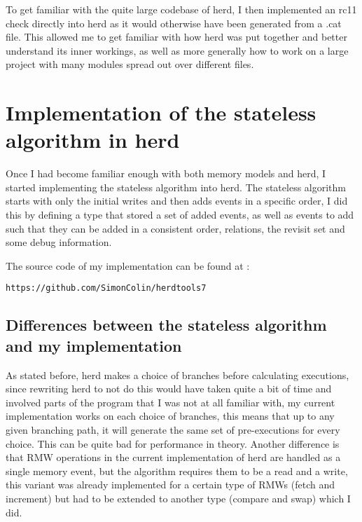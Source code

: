 \documentclass[a4,12pt]{article}
\begin{document}
To get familiar with the quite large codebase of herd, I then implemented an rc11 check directly into herd as it would otherwise have been generated from a .cat file. This allowed me to get familiar with how herd was put together and better understand its inner workings, as well as more generally how to work on a large project with many modules spread out over different files.

\section{Implementation of the stateless algorithm in herd}

Once I had become familiar enough with both memory models and herd, I started implementing the stateless algorithm into herd. The stateless algorithm starts with only the initial writes and then adds events in a specific order, I did this by defining a type that stored a set of added events, as well as events to add such that they can be added in a consistent order, relations, the revisit set and some debug information.

The source code of my implementation can be found at :
\begin{lstlisting}
https://github.com/SimonColin/herdtools7
\end{lstlisting}

\subsection{Differences between the stateless algorithm and my implementation}

As stated before, herd makes a choice of branches before calculating executions, since rewriting herd to not do this would have taken quite a bit of time and involved parts of the program that I was not at all familiar with, my current implementation works on each choice of branches, this means that up to any given branching path, it will generate the same set of pre-executions for every choice. This can be quite bad for performance in theory. Another difference is that RMW operations in the current implementation of herd are handled as a single memory event, but the algorithm requires them to be a read and a write, this variant was already implemented for a certain type of RMWs (fetch and increment) but had to be extended to another type (compare and swap) which I did.

\end{document}
